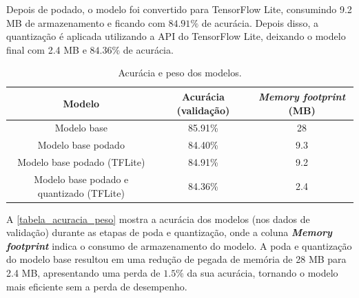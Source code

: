 Depois de podado, o modelo foi convertido para TensorFlow Lite, consumindo 9.2 MB de armazenamento e ficando com
$84.91\%$ de acurácia. Depois disso, a quantização é aplicada utilizando a API do TensorFlow Lite, deixando o modelo
final com 2.4 MB e $84.36\%$ de acurácia.

\begin{center}
\begin{table}[htb]
\centering
\ABNTEXfontereduzida
\caption[Acurácia e peso dos modelos]{Acurácia e peso dos modelos.}
\label{tabela_acuracia_peso}
\begin{tabular}{ |c|c|c| }
	\hline
	\textbf{Modelo} & \textbf{Acurácia (validação)}  & \textbf{\textit{Memory footprint} (MB)} \\
	\hline
	Modelo base 				 & 	85.91\% 	& 	28	\\
	Modelo base podado 			 & 	84.40\% 	& 	9.3	\\
	Modelo base podado (TFLite) 		 & 	84.91\% 	& 	9.2	\\
	Modelo base podado e quantizado (TFLite) & 	84.36\% 	& 	2.4	\\
	\hline
\end{tabular}
\end{table}
\end{center}

A \autoref{tabela_acuracia_peso} mostra a acurácia dos modelos (nos dados de validação) durante as etapas de poda e
quantização, onde a coluna \textbf{\textit{Memory footprint}}  indica o consumo de armazenamento do modelo.
A poda e quantização do modelo base resultou em uma redução de pegada de memória de 28 MB para 2.4 MB, apresentando uma perda
de $1.5\%$ da sua acurácia, tornando o modelo mais eficiente sem a perda de desempenho.
